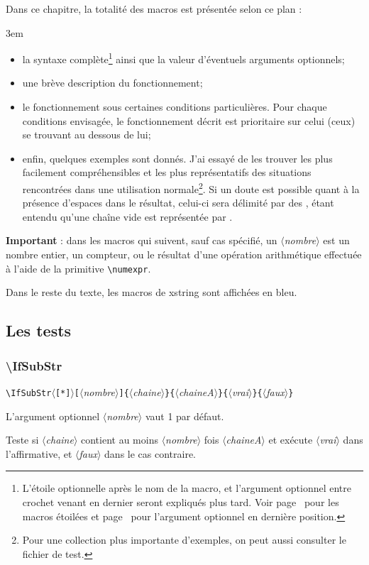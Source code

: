 \documentclass[a4paper,10pt,french]{article}
\newcommand\guill[1]{\og{}#1\fg{}}
\newcommand\argu[1]{$\langle$\textit{#1}$\rangle$}
\newcommand\ARGU[1]{\texttt{\color{black}\{}\argu{#1}\texttt{\color{black}\}}}
\newcommand\arguC[1]{\texttt{\color{black}[}\argu{#1}\texttt{\color{black}]}}
\newcommand\etoile{$\langle$\texttt{[*]}$\rangle$}
\newcommand\Xstring{\textsf{xstring}\xspace}
\newcommand\verbinline{\lstinline[basicstyle=\normalsize\ttfamily]}
\begin{document}
Dans ce chapitre, la totalité des macros est présentée selon ce plan :\par\nobreak\smallskip
\parindent3em
\begin{itemize}
	\item la syntaxe complète\footnote{L'étoile optionnelle après le nom de la macro, et l'argument optionnel entre crochet venant en dernier seront expliqués plus tard. Voir page~\pageref{macrosetoilees} pour les macros étoilées et page~\pageref{argumentoptionnel} pour l'argument optionnel en dernière position.} ainsi que la valeur d'éventuels arguments optionnels;
	\item une brève description du fonctionnement;
	\item le fonctionnement sous certaines conditions particulières. Pour chaque conditions envisagée, le fonctionnement décrit est prioritaire sur celui (ceux) se trouvant au dessous de lui;
	\item enfin, quelques exemples sont donnés. J'ai essayé de les trouver les plus facilement compréhensibles et les plus représentatifs des situations rencontrées dans une utilisation normale\footnote{Pour une collection plus importante d'exemples, on peut aussi consulter le fichier de test.}. Si un doute est possible quant à la présence d'espaces dans le résultat, celui-ci sera délimité par des \guill{\textbar}, étant entendu qu'une chaîne vide est représentée par \guill{\textbar\textbar}.
\end{itemize}
\parindent0pt\smallskip

\textbf{Important} : dans les macros qui suivent, sauf cas spécifié, un \argu{nombre} est un nombre entier, un compteur, ou le résultat d'une opération arithmétique effectuée à l'aide de la primitive \verb|\numexpr|.\smallskip

Dans le reste du texte, les macros de \Xstring sont affichées en {\makeatletter\color{@xs@keywordsxstring}bleu}.

\subsection{Les tests}
\subsubsection{\ttfamily\textbackslash IfSubStr}
\verbinline|\IfSubStr|\etoile\arguC{nombre}\ARGU{chaine}\ARGU{chaineA}\ARGU{vrai}\ARGU{faux}
\smallskip

L'argument optionnel \argu{nombre} vaut 1 par défaut.\par\nobreak\smallskip
Teste si \argu{chaine} contient au moins \argu{nombre} fois \argu{chaineA} et exécute \argu{vrai} dans l'affirmative, et \argu{faux} dans le cas contraire.\medskip
\end{document}
